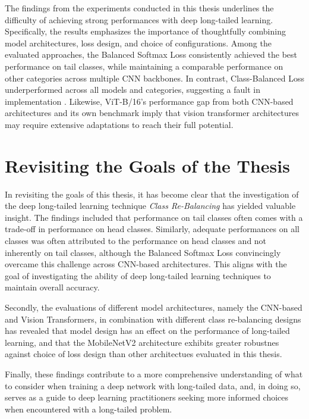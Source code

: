 
The findings from the experiments conducted in this thesis underlines the difficulty of achieving strong performances with deep long-tailed learning. Specifically, the results emphasizes the importance of thoughtfully combining model architectures, loss design, and choice of configurations. Among the evaluated approaches, the Balanced Softmax Loss consistently achieved the best performance on tail classes, while maintaining a comparable performance on other categories across multiple CNN backbones. In contrast, Class-Balanced Loss underperformed across all models and categories, suggesting a fault in implementation . Likewise, ViT-B/16's performance gap from both CNN-based architectures and its own benchmark imply that vision transformer architectures may require extensive adaptations to reach their full potential.  

\section{Revisiting the Goals of the Thesis}
In revisiting the goals of this thesis, it has become clear that the investigation of the deep long-tailed learning technique \emph{Class Re-Balancing} has yielded valuable insight. The findings included that performance on tail classes often comes with a trade-off in performance on head classes. Similarly, adequate performances on all classes was often attributed to the performance on head classes and not inherently on tail classes, although the Balanced Softmax Loss convincingly overcame this challenge across CNN-based architectures. This aligns with the goal of investigating the ability of deep long-tailed learning techniques to maintain overall accuracy. 

Secondly, the evaluations of different model architectures, namely the CNN-based and Vision Transformers, in combination with different class re-balancing designs has revealed that model design has an effect on the performance of long-tailed learning, and that the MobileNetV2 architecture exhibits greater robustnes against choice of loss design than other architectues evaluated in this thesis. 

Finally, these findings contribute to a more comprehensive understanding of what to consider when training a deep network with long-tailed data, and, in doing so, serves as a guide to deep learning practitioners seeking more informed choices when encountered with a long-tailed problem.


